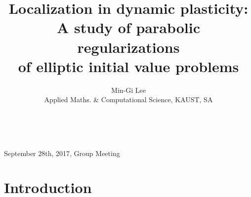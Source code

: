 \documentclass{beamer}
\begin{document}
\title[Localization ]{Localization in dynamic plasticity: \\ A study of parabolic regularizations  \\
of elliptic initial value problems}
\author{\vskip 5pt \small {Min-Gi Lee}\\ \vskip 5pt \scriptsize Applied Maths. \& Computational Science, KAUST, SA\\}

\vskip 15pt

\date{~}
\begin{frame}
  \titlepage
  \vskip -60pt
  \center
  {\small
  {\scriptsize September 28th, 2017, Group Meeting}\\}
\end{frame}

\section{Introduction}
\end{document}
